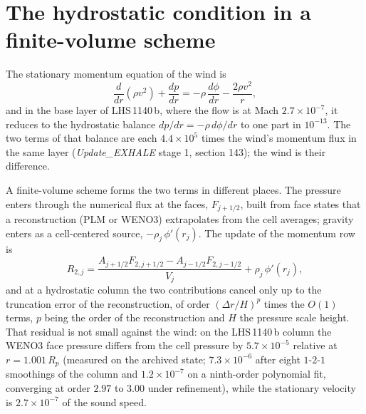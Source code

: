 \documentclass[english,a4paper]{my_memo}
\begin{document}
\section{The hydrostatic condition in a finite-volume scheme}

The stationary momentum equation of the wind is
\begin{equation}
  \frac{d}{dr}\!\left(\rho v^{2}\right) + \frac{dp}{dr}
  = -\rho\,\frac{d\phi}{dr} - \frac{2\rho v^{2}}{r},
  \label{eq:mom}
\end{equation}
and in the base layer of LHS\,1140\,b, where the flow is at Mach
$2.7\times10^{-7}$, it reduces to the hydrostatic balance
$dp/dr = -\rho\,d\phi/dr$ to one part in $10^{-13}$. The two terms of that
balance are each $4.4\times10^{5}$ times the wind's momentum flux in the same
layer (\emph{Update\_EXHALE} stage 1, section 143); the wind is their
difference.

A finite-volume scheme forms the two terms in different places. The pressure
enters through the numerical flux at the faces, $F_{j+1/2}$, built from face
states that a reconstruction (PLM or WENO3) extrapolates from the cell
averages; gravity enters as a cell-centered source, $-\rho_j\,\phi'(r_j)$. The
update of the momentum row is
\begin{equation}
  R_{2,j} = \frac{A_{j+1/2}F_{2,j+1/2} - A_{j-1/2}F_{2,j-1/2}}{V_j}
            + \rho_j\,\phi'(r_j),
\end{equation}
and at a hydrostatic column the two contributions cancel only up to the
truncation error of the reconstruction, of order $(\Delta r/H)^{p}$ times the
$O(1)$ terms, $p$ being the order of the reconstruction and $H$ the pressure
scale height. That residual is not small against the wind: on the LHS\,1140\,b
column the WENO3 face pressure differs from the cell pressure by
$5.7\times10^{-5}$ relative at $r = 1.001\,R_p$ (measured on the archived
state; $7.3\times10^{-6}$ after eight $1$-$2$-$1$ smoothings of the column
and $1.2\times10^{-7}$ on a ninth-order polynomial fit, converging at order
$2.97$ to $3.00$ under refinement), while the stationary velocity is
$2.7\times10^{-7}$ of the sound speed.
\end{document}
